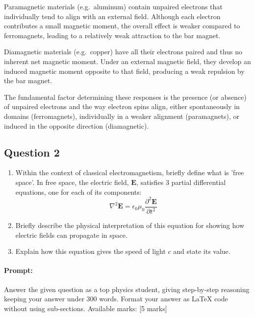 \documentclass{article}
\begin{document}
Paramagnetic materials (e.g.\ aluminum) contain unpaired electrons that individually 
tend to align with an external field. Although each electron contributes a small 
magnetic moment, the overall effect is weaker compared to ferromagnets, leading 
to a relatively weak attraction to the bar magnet.

Diamagnetic materials (e.g.\ copper) have all their electrons paired and thus no 
inherent net magnetic moment. Under an external magnetic field, they develop an 
induced magnetic moment opposite to that field, producing a weak repulsion by the 
bar magnet.

The fundamental factor determining these responses is the presence (or absence) 
of unpaired electrons and the way electron spins align, either spontaneously in 
domains (ferromagnets), individually in a weaker alignment (paramagnets), or 
induced in the opposite direction (diamagnetic).


\subsection{Question 2}
\begin{enumerate}
    \item Within the context of classical electromagnetism, briefly define what is 'free space'. In free space, the electric field, $\mathbf{E}$, satisfies 3 partial differential equations, one for each of its components:
    \[
    \nabla^2 \mathbf{E} = \epsilon_0 \mu_0 \frac{\partial^2 \mathbf{E}}{\partial t^2}
    \]
    \item Briefly describe the physical interpretation of this equation for showing how electric fields can propagate in space.
    \item Explain how this equation gives the speed of light $c$ and state its value.
\end{enumerate}


\paragraph{Prompt: \\} 
Answer the given question as a top physics student, giving step-by-step reasoning keeping your answer under 300 words. Format your answer as LaTeX code without using sub-sections. Available marks: [5 marks]
\end{document}
